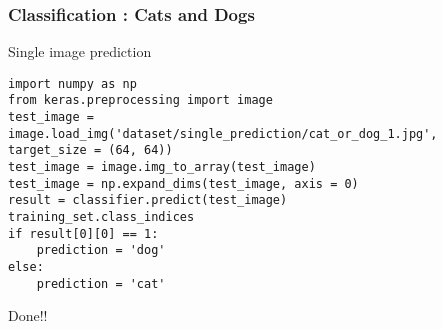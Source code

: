 \begin{frame}[fragile] \frametitle{Classification : Cats and Dogs}
Single image prediction
\begin{lstlisting}
import numpy as np
from keras.preprocessing import image
test_image = image.load_img('dataset/single_prediction/cat_or_dog_1.jpg', target_size = (64, 64))
test_image = image.img_to_array(test_image)
test_image = np.expand_dims(test_image, axis = 0)
result = classifier.predict(test_image)
training_set.class_indices
if result[0][0] == 1:
    prediction = 'dog'
else:
    prediction = 'cat'

\end{lstlisting}
Done!!
\end{frame}


%
%
%
%
%
%
%
